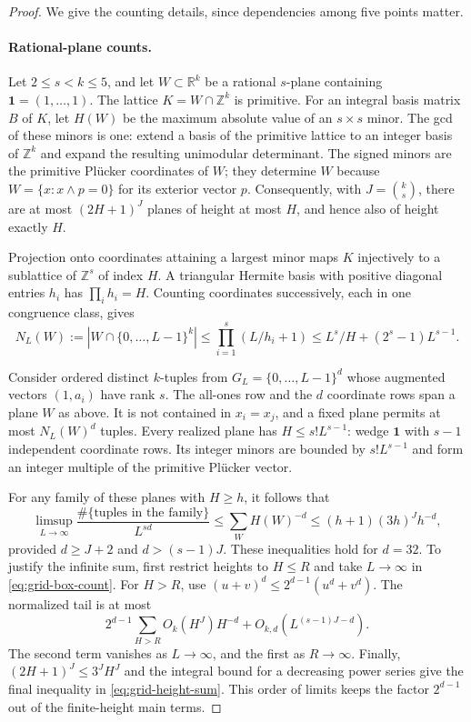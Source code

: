\documentclass[11pt]{article}
\theoremstyle{definition}
\theoremstyle{remark}
\newcommand{\Z}{\mathbb Z}
\newcommand{\R}{\mathbb R}
\begin{document}
\begin{proof}
We give the counting details, since dependencies among five points matter.

\paragraph{Rational-plane counts.}
Let $2\le s<k\le5$, and let $W\subset\R^k$ be a rational $s$-plane
containing $\mathbf1=(1,\ldots,1)$. The lattice $K=W\cap\Z^k$ is
primitive. For an integral basis matrix $B$ of $K$, let $H(W)$ be the
maximum absolute value of an $s\times s$ minor. The gcd of these minors
is one: extend a basis of the primitive lattice to an integer basis of
$\Z^k$ and expand the resulting unimodular determinant. The signed
minors are the primitive Pl\"ucker coordinates of $W$; they determine
$W$ because $W=\{x:x\wedge p=0\}$ for its exterior vector $p$.
Consequently, with $J=\binom ks$, there are at most $(2H+1)^J$ planes
of height at most $H$, and hence also of height exactly $H$.

Projection onto coordinates attaining a largest minor maps $K$
injectively to a sublattice of $\Z^s$ of index $H$. A triangular
Hermite basis with positive diagonal entries $h_i$ has $\prod_i h_i=H$.
Counting coordinates successively, each in one congruence class, gives
\begin{equation}\label{eq:grid-box-count}
N_L(W):=|W\cap\{0,\ldots,L-1\}^k|
\le\prod_{i=1}^s(L/h_i+1)
\le L^s/H+(2^s-1)L^{s-1}.
\end{equation}

Consider ordered distinct $k$-tuples from $G_L=\{0,\ldots,L-1\}^d$
whose augmented vectors $(1,a_i)$ have rank $s$. The all-ones row and
the $d$ coordinate rows span a plane $W$ as above. It is not contained
in $x_i=x_j$, and a fixed plane permits at most $N_L(W)^d$ tuples.
Every realized plane has $H\le s!L^{s-1}$: wedge $\mathbf1$ with
$s-1$ independent coordinate rows. Its integer minors are bounded by
$s!L^{s-1}$ and form an integer multiple of the primitive Pl\"ucker
vector.

For any family of these planes with $H\ge h$, it follows that
\begin{equation}\label{eq:grid-height-sum}
\limsup_{L\to\infty}
\frac{\#\{\text{tuples in the family}\}}{L^{sd}}
\le\sum_W H(W)^{-d}
\le(h+1)(3h)^J h^{-d},
\end{equation}
provided $d\ge J+2$ and $d>(s-1)J$. These inequalities hold for $d=32$.
To justify the infinite sum, first restrict heights to $H\le R$ and
take $L\to\infty$ in \eqref{eq:grid-box-count}. For $H>R$, use
$(u+v)^d\le2^{d-1}(u^d+v^d)$. The normalized tail is at most
\[
2^{d-1}\sum_{H>R}O_k(H^J)H^{-d}
+O_{k,d}(L^{(s-1)J-d}).
\]
The second term vanishes as $L\to\infty$, and the first as $R\to\infty$.
Finally, $(2H+1)^J\le3^JH^J$ and the integral bound for a decreasing
power series give the final inequality in \eqref{eq:grid-height-sum}.
This order of limits keeps the factor $2^{d-1}$ out of the finite-height
main terms.


\end{proof}
\end{document}
